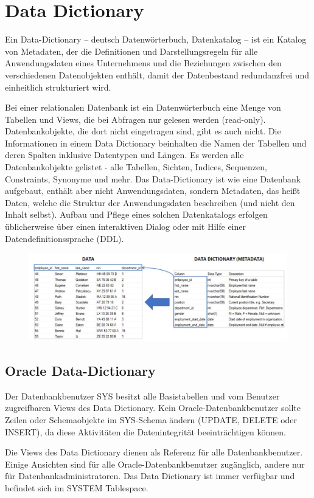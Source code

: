\section{Data Dictionary}

Ein Data-Dictionary – deutsch Datenwörterbuch, Datenkatalog – ist ein Katalog von Metadaten, der die Definitionen und Darstellungsregeln für alle Anwendungsdaten eines Unternehmens und die Beziehungen zwischen den verschiedenen Datenobjekten enthält, damit der Datenbestand redundanzfrei und einheitlich strukturiert wird. 

Bei einer relationalen Datenbank ist ein Datenwörterbuch eine Menge von Tabellen und Views, die bei Abfragen nur gelesen werden (read-only). Datenbankobjekte, die dort nicht eingetragen sind, gibt es auch nicht. Die Informationen in einem Data Dictionary beinhalten die Namen der Tabellen und deren Spalten inklusive Datentypen und Längen. Es werden alle Datenbankobjekte gelistet - alle Tabellen, Sichten, Indices, Sequenzen, Constraints, Synonyme und mehr. Das Data-Dictionary ist wie eine Datenbank aufgebaut, enthält aber nicht Anwendungsdaten, sondern Metadaten, das heißt Daten, welche die Struktur der Anwendungsdaten beschreiben (und nicht den Inhalt selbst). Aufbau und Pflege eines solchen Datenkatalogs erfolgen üblicherweise über einen interaktiven Dialog oder mit Hilfe einer Datendefinitionssprache (DDL).

\begin{figure}[H]
    \centering
    \includegraphics[width=.4\textwidth]{Content/images/modellierung/data.png}
    \caption{}
    \label{fig:modellierung:data}
\end{figure}

\subsection{Oracle Data-Dictionary}

Der Datenbankbenutzer SYS besitzt alle Basistabellen und vom Benutzer zugreifbaren Views des Data Dictionary.
Kein Oracle-Datenbankbenutzer sollte Zeilen oder Schemaobjekte im SYS-Schema ändern (UPDATE, DELETE oder INSERT), da diese Aktivitäten die Datenintegrität beeinträchtigen können.

Die Views des Data Dictionary dienen als Referenz für alle Datenbankbenutzer. Einige Ansichten sind für alle Oracle-Datenbankbenutzer zugänglich, andere nur für Datenbankadministratoren. 
Das Data Dictionary ist immer verfügbar und befindet sich im SYSTEM Tablespace.

